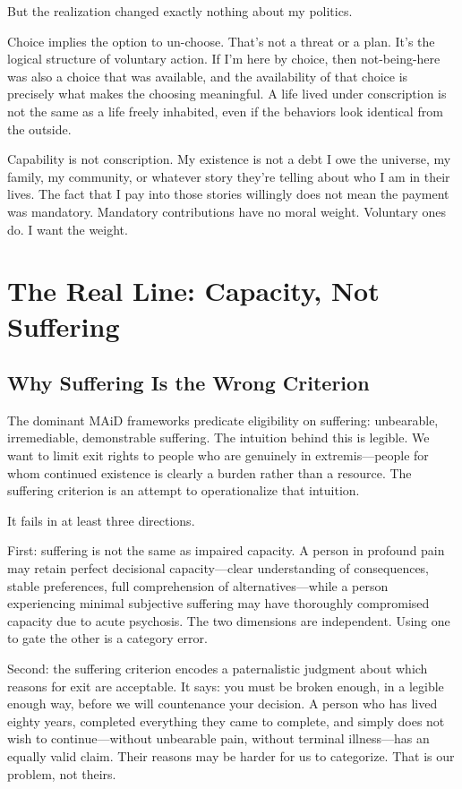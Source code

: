 \documentclass[10pt, letterpaper, twocolumn]{article}
\begin{document}
But the realization changed exactly nothing about my politics.

Choice implies the option to un-choose. That's not a threat or a plan. It's the logical structure of voluntary action. If I'm here by choice, then not-being-here was also a choice that was available, and the availability of that choice is precisely what makes the choosing meaningful. A life lived under conscription is not the same as a life freely inhabited, even if the behaviors look identical from the outside.

Capability is not conscription. My existence is not a debt I owe the universe, my family, my community, or whatever story they're telling about who I am in their lives. The fact that I pay into those stories willingly does not mean the payment was mandatory. Mandatory contributions have no moral weight. Voluntary ones do. I want the weight.

\section{The Real Line: Capacity, Not Suffering}

\subsection{Why Suffering Is the Wrong Criterion}

The dominant MAiD frameworks predicate eligibility on suffering: unbearable, irremediable, demonstrable suffering. The intuition behind this is legible. We want to limit exit rights to people who are genuinely in extremis---people for whom continued existence is clearly a burden rather than a resource. The suffering criterion is an attempt to operationalize that intuition.

It fails in at least three directions.

First: suffering is not the same as impaired capacity. A person in profound pain may retain perfect decisional capacity---clear understanding of consequences, stable preferences, full comprehension of alternatives---while a person experiencing minimal subjective suffering may have thoroughly compromised capacity due to acute psychosis. The two dimensions are independent. Using one to gate the other is a category error.

Second: the suffering criterion encodes a paternalistic judgment about which reasons for exit are acceptable. It says: you must be broken enough, in a legible enough way, before we will countenance your decision. A person who has lived eighty years, completed everything they came to complete, and simply does not wish to continue---without unbearable pain, without terminal illness---has an equally valid claim. Their reasons may be harder for us to categorize. That is our problem, not theirs.
\end{document}
